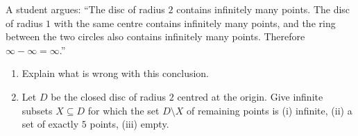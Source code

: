 A student argues: ``The disc of radius $2$ contains infinitely many points. The disc of radius $1$ with the same centre contains infinitely many points, and the ring between the two circles also contains infinitely many points. Therefore $\infty-\infty=\infty$.''
\begin{enumerate}
\item[(a)] Explain what is wrong with this conclusion.
\item[(b)] Let $D$ be the closed disc of radius $2$ centred at the origin. Give infinite subsets $X\subseteq D$ for which the set $D\setminus X$ of remaining points is (i) infinite, (ii) a set of exactly $5$ points, (iii) empty.
\end{enumerate}
